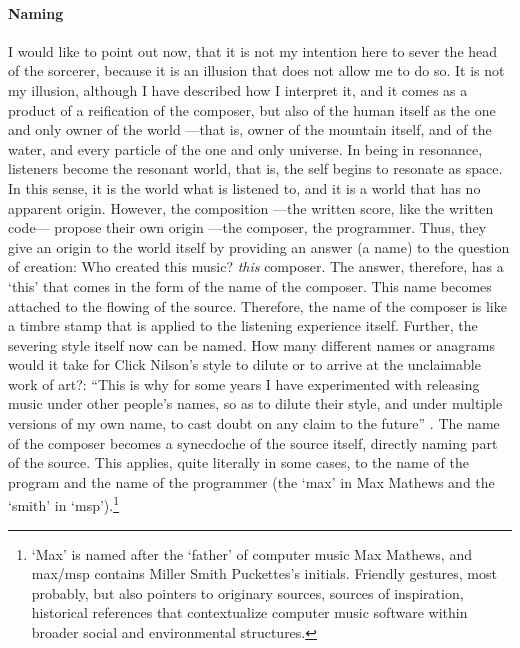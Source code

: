 \paragraph{Naming}
I would like to point out now, that it is not my intention here to sever the head of the sorcerer, because it is an illusion that does not allow me to do so. It is not my illusion, although I have described how I interpret it, and it comes as a product of a reification of the composer, but also of the human itself as the one and only owner of the world ---that is, owner of the mountain itself, and of the water, and every particle of the one and only universe. In being in resonance, listeners become the resonant world, that is, the self begins to resonate as space. In this sense, it is the world what is listened to, and it is a world that has no apparent origin. However, the composition ---the written score, like the written code--- propose their own origin ---the composer, the programmer. Thus, they give an origin to the world itself by providing an answer (a name) to the question of creation: Who created this music? \textit{this} composer. The answer, therefore, has a `this' that comes in the form of the name of the composer. This name becomes attached to the flowing of the source. Therefore, the name of the composer is like a timbre stamp that is applied to the listening experience itself. Further, the severing style itself now can be named. How many different names or anagrams would it take for Click Nilson's style to dilute or to arrive at the unclaimable work of art?: ``This is why for some years I have experimented with releasing music under other people's names, so as to dilute their style, and under multiple versions of my own name, to cast doubt on any claim to the future'' \parencite{Col15:Col}. The name of the composer becomes a synecdoche of the source itself, directly naming part of the source. This applies, quite literally in some cases, to the name of the program and the name of the programmer (the `max' in Max Mathews and the `smith' in `msp').\footnote{`Max' is named after the `father' of computer music Max Mathews, and \gls{max/msp} contains Miller Smith Puckettes's initials. Friendly gestures, most probably, but also pointers to originary sources, sources of inspiration, historical references that contextualize computer music software within broader social and environmental structures.}

